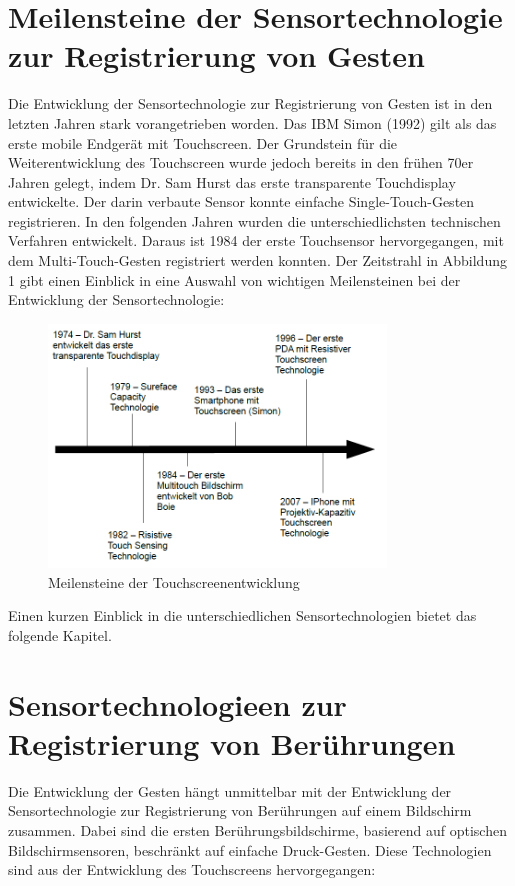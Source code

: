 \documentclass[12pt,oneside,a4paper,bibtotoc,liststotoc]{scrreprt}
\begin{document}
\section{Meilensteine der Sensortechnologie zur Registrierung von Gesten}
Die Entwicklung der Sensortechnologie zur Registrierung von Gesten ist in den letzten Jahren stark vorangetrieben worden. Das IBM Simon (1992) gilt als das erste mobile Endgerät mit Touchscreen. Der Grundstein für die Weiterentwicklung des Touchscreen wurde jedoch bereits in den frühen 70er Jahren gelegt, indem Dr. Sam Hurst das erste transparente Touchdisplay entwickelte. Der darin verbaute Sensor konnte einfache Single-Touch-Gesten registrieren. In den folgenden Jahren wurden die unterschiedlichsten technischen Verfahren entwickelt. Daraus ist 1984 der erste Touchsensor hervorgegangen, mit dem Multi-Touch-Gesten registriert werden konnten. Der Zeitstrahl in Abbildung 1 gibt einen Einblick in eine Auswahl von wichtigen Meilensteinen bei der Entwicklung der Sensortechnologie:
\begin{figure}[H]
  \begin{centering}
    \includegraphics[width=0.8\textwidth]{img/Einleitung_History_Touchscreen.png}
    \caption{Meilensteine der Touchscreenentwicklung \cite[vgl. From touch displays to the Surface]{001}}
    \label{Touchscreenentwicklung_Meilensteine}
  \end{centering}
\end{figure}
Einen kurzen Einblick in die unterschiedlichen Sensortechnologien bietet das folgende Kapitel.

\section{Sensortechnologieen zur Registrierung von Berührungen}
Die Entwicklung der Gesten hängt unmittelbar mit der Entwicklung der Sensortechnologie zur Registrierung von Berührungen auf einem Bildschirm zusammen. Dabei sind die ersten Berührungsbildschirme, basierend auf optischen Bildschirmsensoren, beschränkt auf einfache Druck-Gesten. Diese Technologien sind aus der Entwicklung des Touchscreens hervorgegangen:
\end{document}
